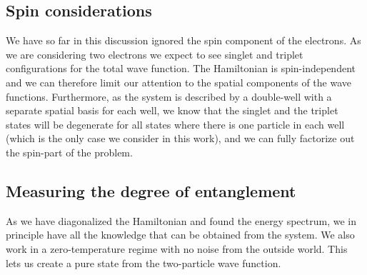 \documentclass[twocolumn,superscriptaddress,unsortedaddress,
 amsmath,amssymb,
 aps,
]{revtex4-2}
\begin{document}
    \subsection{Spin considerations}
        We have so far in this discussion ignored the spin component of the electrons.
        As we are considering two electrons we expect to see singlet and triplet
        configurations for the total wave function.
        The Hamiltonian is spin-independent and we can therefore limit our attention
        to the spatial components of the wave functions.
        Furthermore, as the system is described by a double-well with a separate
        spatial basis for each well, we know that the singlet and the triplet states
        will be degenerate for all states where there is one particle in each well
        (which is the only case we consider in this work),
        and we can fully factorize out the spin-part of the problem.


    \subsection{Measuring the degree of entanglement}
        As we have diagonalized the Hamiltonian and found the energy spectrum, we
        in principle have all the knowledge that can be obtained from the system.
        We also work in a zero-temperature regime with no noise from the outside
        world.
        This lets us create a pure state from the two-particle wave function.
\end{document}
